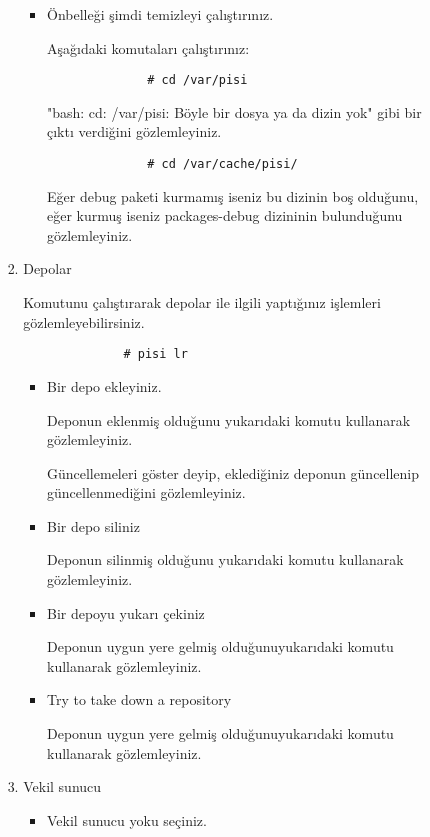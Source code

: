 \documentclass[a4paper,10pt]{article}
\begin{document}
\begin{enumerate}
\begin{enumerate}
\begin{enumerate}
\begin{enumerate}
\begin{itemize}
		      \item Önbelleği şimdi temizleyi çalıştırınız.

		      Aşağıdaki komutaları çalıştırınız: 
		      \begin{verbatim}
		      # cd /var/pisi
		      \end{verbatim}

		      "bash: cd: /var/pisi: Böyle bir dosya ya da dizin yok" gibi bir çıktı verdiğini gözlemleyiniz.
	    
		      \begin{verbatim}
		      # cd /var/cache/pisi/
		      \end{verbatim}
		
		      Eğer debug paketi kurmamış iseniz bu dizinin boş olduğunu, eğer kurmuş iseniz packages-debug dizininin bulunduğunu gözlemleyiniz.
		   
                \end{itemize} 
                \item Depolar

		 Komutunu çalıştırarak depolar ile ilgili yaptığınız işlemleri gözlemleyebilirsiniz.
		    \begin{verbatim}
		      # pisi lr
		    \end{verbatim}
                \begin{itemize}
                    \item Bir depo ekleyiniz.
		    
		    Deponun eklenmiş olduğunu yukarıdaki komutu kullanarak gözlemleyiniz.

		    Güncellemeleri göster deyip, eklediğiniz deponun güncellenip güncellenmediğini gözlemleyiniz.
                    \item Bir depo siliniz
		
		    Deponun silinmiş olduğunu yukarıdaki komutu kullanarak gözlemleyiniz.
                    \item Bir depoyu yukarı çekiniz
 
		     Deponun uygun yere gelmiş olduğunuyukarıdaki komutu kullanarak gözlemleyiniz.
                    \item Try to take down a repository 

                    Deponun uygun yere gelmiş olduğunuyukarıdaki komutu kullanarak gözlemleyiniz.
                \end{itemize}
                \item Vekil sunucu
                \begin{itemize}
                    \item  Vekil sunucu yoku seçiniz.


\end{itemize}
\end{enumerate}
\end{enumerate}
\end{enumerate}
\end{enumerate}
\end{document}
